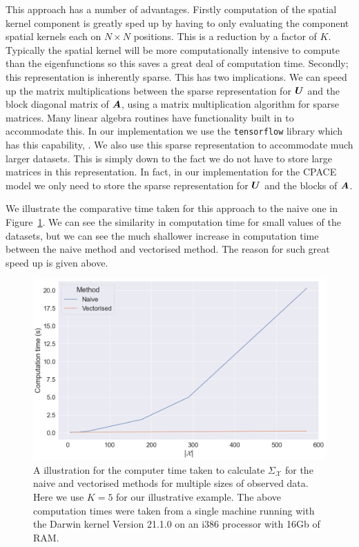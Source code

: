 This approach has a number of advantages.
Firstly computation of the spatial kernel component is greatly sped up by having to only evaluating the component spatial kernels each on $N \times N$ positions.
This is a reduction by a factor of $K$.
Typically the spatial kernel will be more computationally intensive to compute than the eigenfunctions so this saves a great deal of computation time.
Secondly; this representation is inherently sparse.
This has two implications.
We can speed up the matrix multiplications between the sparse representation for $\bm{{U}}$ and the block diagonal matrix of $\bm{{A}}$, using a matrix multiplication algorithm for sparse matrices. 
Many linear algebra routines have functionality built in to accommodate this.
In our implementation we use the \verb*|tensorflow| library which has this capability, \citep{abadi_tensorflow_2016}.
We also use this sparse representation to accommodate much larger datasets.
This is simply down to the fact we do not have to store large matrices in this representation.
In fact, in our implementation for the CPACE model we only need to store the sparse representation for $\bm{{U}}$ and the blocks of $\bm{{A}}$. 

We illustrate the comparative time taken for this approach to the naive one in Figure~\ref{fig:imp_utau}.
We can see the similarity in computation time for small values of the datasets, but we can see the much shallower increase in computation time between the naive method and vectorised method.
The reason for such great speed up is given above.
\begin{figure}
	\centering
	\includegraphics[width=\textwidth]{imp_utau}
	\caption[A illustration for the computer time taken to calculate $\Sigma_\mathcal{X}$ for the naive and vectorised methods for multiple sizes of observed data.]{A illustration for the computer time taken to calculate $\Sigma_\mathcal{X}$ for the naive and vectorised methods for multiple sizes of observed data. Here we use $K = 5$ for our illustrative example. The above computation times were taken from a single machine running with the Darwin kernel Version 21.1.0 on an i386 processor with 16Gb of RAM.}
	\label{fig:imp_utau}
\end{figure}


